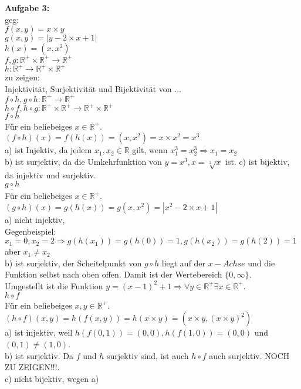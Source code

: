 \documentclass[a4paper]{scrartcl}
\begin{document}
	\begin{flushleft}
		\textbf{Aufgabe 3:}\\
		geg:\\
		$f(x,y) = x\times y$\\
		$g(x,y) = |y-2\times x + 1|$\\
		$h(x)=(x,x^2)$\\
		$f,g: \mathbb{R^+}\times \mathbb{R^+}\rightarrow \mathbb{R^+}$\\
		$h: \mathbb{R^+}\rightarrow\mathbb{R^+}\times \mathbb{R^+}$\\[1em]
		zu zeigen:\\
		Injektivität, Surjektivität und Bijektivität von ...\\
		$f\circ h, g\circ h:\mathbb{R^+}\rightarrow\mathbb{R^+}$	\\
		$h\circ f, h\circ g:\mathbb{R^+}\times\mathbb{R^+}\rightarrow\mathbb{R^+}\times\mathbb{R^+}$\\[1em]
		$\underline{f\circ h}$\\
		Für ein beliebeiges $x\in\mathbb{R^+}$.\\
		$(f\circ h)(x)=f(h(x))=(x,x^2)=x\times x^2=x^3$\\
		a) ist Injektiv, da jedem $x_1,x_2\in \mathbb{R}$ gilt, wenn  $x_1^3=x_2^3 \Rightarrow x_1 = x_2$\\
		b) ist surjektiv,  da die Umkehrfunktion von $y=x^3,x=\sqrt[3]{x}$ ist.
		c) ist bijektiv, da injektiv und surjektiv.\\[1em]

		$\underline{g\circ h}$\\
		Für ein beliebeiges $x\in\mathbb{R^+}$.\\
		$(g\circ h)(x)=g(h(x))=g(x,x^2)=|x^2-2\times x+1|$\\
		a) nicht injektiv,\\
		Gegenbeispiel: $x_1=0,x_2=2\Rightarrow g(h(x_1))=g(h(0))=1, g(h(x_2))= g(h(2))=1$ aber $x_1\neq x_2$\\
		b) ist surjektiv, der Scheitelpunkt von $g\circ h$ liegt auf der $x-Achse$ und die Funktion selbst nach oben offen. Damit ist der Wertebereich $\{0,\infty\}$.\\
		Umgestellt ist die Funktion $y=(x-1)^2+1\Rightarrow \forall y\in\mathbb{R^+}\exists x\in\mathbb{R^+}$.\\[1em]

		$\underline{h\circ f}$\\
		Für ein beliebeiges $x,y\in\mathbb{R^+}$.\\
		$(h\circ f)(x,y)=h(f(x,y))=h(x\times y)=(x\times y,(x\times y)^2)$\\
		a) ist injektiv, weil $h(f(0,1))=(0,0), h(f(1,0))=(0,0)$ und $(0,1)\neq(1,0)$.\\
		b) ist surjektiv. Da $f$ und $h$ surjektiv sind, ist auch $h\circ f$ auch surjektiv. NOCH ZU ZEIGEN!!!.\\
		c) nicht bijektiv, wegen a)\\[1em]


\end{flushleft}
\end{document}
